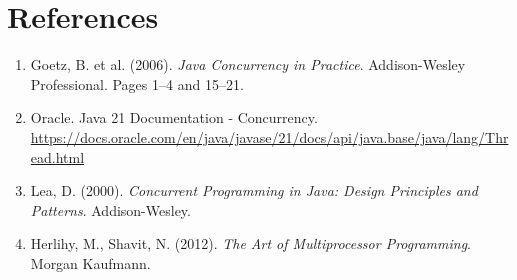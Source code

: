 \documentclass[10pt,a4paper,twocolumn]{article}
\begin{document}
\section{References}

\begin{enumerate}
    \item Goetz, B. et al. (2006). \textit{Java Concurrency in Practice}. Addison-Wesley Professional. Pages 1--4 and 15--21.
    
    \item Oracle. Java 21 Documentation - Concurrency. \url{https://docs.oracle.com/en/java/javase/21/docs/api/java.base/java/lang/Thread.html}
    
    \item Lea, D. (2000). \textit{Concurrent Programming in Java: Design Principles and Patterns}. Addison-Wesley.
    
    \item Herlihy, M., Shavit, N. (2012). \textit{The Art of Multiprocessor Programming}. Morgan Kaufmann.
\end{enumerate}
\end{document}
